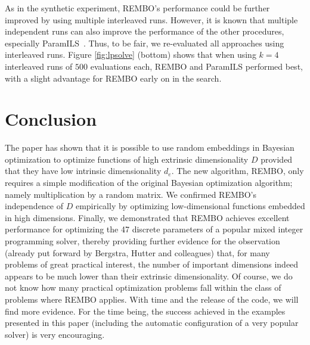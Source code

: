 \documentclass{article}
\begin{document}
As in the synthetic experiment, REMBO's performance could be further improved by using multiple interleaved runs.
However, it is known that multiple independent runs can also improve the performance of the other procedures, especially ParamILS~\cite{HutHooLey12-ParallelAC}. Thus, to be fair, we re-evaluated all approaches using interleaved runs. Figure \ref{fig:lpsolve} (bottom) shows that when using $k=4$ interleaved runs of $500$ evaluations each, REMBO and ParamILS performed best, with a slight advantage for REMBO early on in the search.





\section{Conclusion} \label{sec:conclusion}


The paper has shown that it is possible to use random embeddings in Bayesian optimization to optimize functions 
of high extrinsic dimensionality $D$ provided that they have low intrinsic dimensionality $d_e$. 
The new algorithm, REMBO, only requires a simple modification of the original Bayesian optimization algorithm; namely multiplication by a random matrix. 
We confirmed REMBO's independence of $D$ empirically by optimizing low-dimensional functions embedded in high dimensions. 
Finally, we demonstrated that REMBO achieves excellent performance for optimizing the 47 discrete parameters of a popular mixed integer programming solver,
thereby providing further evidence for the observation (already put forward by Bergstra, Hutter and colleagues) that, for many problems of great practical interest, the number of 
important dimensions indeed appears to be much lower than their extrinsic dimensionality. Of course, we do not know how many practical optimization problems fall within the class of problems where REMBO applies. With time and the release of the code, we will find more evidence. For the time being, the success achieved in the examples presented in this paper (including the automatic configuration of a very popular solver) is very encouraging.











\end{document}
